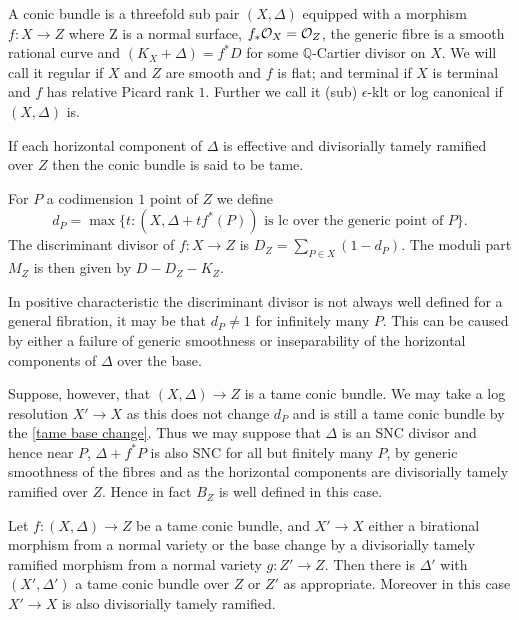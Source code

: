 \begin{definition}
	A conic bundle is a threefold sub pair $(X,\Delta)$ equipped with a morphism $f\colon X \to Z$ where Z is a normal surface, $f_{*}\mathcal{O}_{X}=\mathcal{O}_{Z}$, the generic fibre is a smooth rational curve and $(K_{X}+\Delta)=f^{*}D$ for some $\mathbb{Q}$-Cartier divisor on $X$. We will call it regular if $X$ and $Z$ are smooth and $f$ is flat; and terminal if $X$ is terminal and $f$ has relative Picard rank $1$. Further we call it (sub) $\epsilon$-klt or log canonical if $(X,\Delta)$ is.
	
	If each horizontal component of $\Delta$ is effective and divisorially tamely ramified over $Z$ then the conic bundle is said to be tame.
	
	For $P$ a codimension $1$ point of $Z$ we define $$d_{P}=\max\{t\colon  (X,\Delta+tf^{*}(P)) \text{ is lc over the generic point of } P\}.$$
	The discriminant divisor of $f\colon X \to Z$ is $D_{Z}=\sum_{P \in X}(1-d_{P})$.
	The moduli part $M_{Z}$ is then given by $D-D_{Z}-K_{Z}$.
\end{definition}


In positive characteristic the discriminant divisor is not always well defined for a general fibration, it may be that $d_{P} \neq 1$ for infinitely many $P$. This can be caused by either a failure of generic smoothness or inseparability of the horizontal components of $\Delta$ over the base.

Suppose, however, that $(X,\Delta) \to Z$ is a tame conic bundle. We may take a log resolution $X' \to X$ as this does not change $d_{P}$ and is still a tame conic bundle by the \autoref{tame base change}. Thus we may suppose that $\Delta$ is an SNC divisor and hence near $P$, $\Delta+f^{*}P$ is also SNC for all but finitely many $P$, by generic smoothness of the fibres and as the horizontal components are divisorially tamely ramified over $Z$. Hence in fact $B_{Z}$ is well defined in this case.

\begin{lemma}\label{tame base change}
	Let $f\colon (X,\Delta) \to Z$ be a tame conic bundle, and $X' \to X$ either a birational morphism from a normal variety or the base change by a divisorially tamely ramified morphism from a normal variety $g\colon Z' \to Z$. Then there is $\Delta'$ with $(X',\Delta')$ a tame conic bundle over $Z$ or $Z'$ as appropriate. Moreover in this case $X' \to X$ is also divisorially tamely ramified.
\end{lemma}

